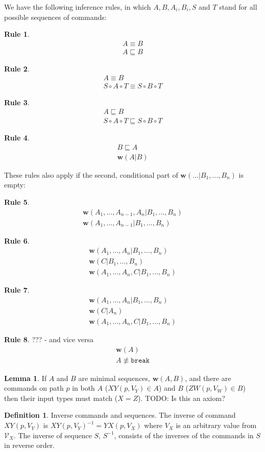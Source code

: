 \documentclass[12pt]{article}
\newcommand{\setvx}[1]{\mathcal{V}_{#1}}
\newcommand{\cbrk}{\mathtt{break}}
\newcommand{\fscommand}[2]{{#1#2}}
\newcommand{\cxy}{\fscommand{X}{Y}}
\newcommand{\cyx}{\fscommand{Y}{X}}
\newcommand{\czw}{\fscommand{Z}{W}}
\newcommand{\cc}{\circ}
\newcommand{\eqext}{\sqsubseteq}
\newcommand{\nequiv}{\not\equiv}
\newcommand{\works}[1]{{\mathbf{w}}({#1})}
\newcommand{\worksc}[2]{{\mathbf{w}}({#1}|{#2})}
\newcommand{\infer}[2]{\begin{array}{c}{#1}\\\hline{#2}\end{array}}
\newcommand{\inferr}[3]{\begin{array}{c}{#1}\\{#2}\\\hline{#3}\end{array}}
\theoremstyle{definition}
\newtheorem{mydef}{Definition}
\newtheorem{mylem}{Lemma}
\newtheorem{myrul}{Rule}
\begin{document}
We have the following inference rules, in which $A,B,A_i,B_i,S$ and $T$ stand for all possible sequences of commands:

\begin{myrul}\label{r_eq_ex}
\[\infer{A\equiv B}{A\eqext B}\]
\end{myrul}

\begin{myrul}
\[\infer{A\equiv B}{S\cc A\cc T\equiv S\cc B\cc T}\]
\end{myrul}

\begin{myrul}
\[\infer{A\eqext B}{S\cc A\cc T\eqext S\cc B\cc T}\]
\end{myrul}

\begin{myrul}\label{r_ex_w}
\[\infer{B\eqext A}{\worksc{A}{B}}\]
\end{myrul}

These rules also apply if the second, conditional part of $\worksc{\ldots}{B_1,\ldots,B_n}$ is empty:

\begin{myrul}
\[\infer{\worksc{A_1,\ldots,A_{n-1},A_n}{B_1,\ldots,B_n}}{\worksc{A_1,\ldots,A_{n-1}}{B_1,\ldots,B_n}}\]
\end{myrul}

\begin{myrul}\label{r_w_combine}
\[\inferr{\worksc{A_1,\ldots,A_n}{B_1,\ldots,B_n}}{\worksc{C}{B_1,\ldots,B_n}}{\worksc{A_1,\ldots,A_n,C}{B_1,\ldots,B_n}}\]
\end{myrul}

\begin{myrul}\label{r_w_w}
\[\inferr{\worksc{A_1,\ldots,A_n}{B_1,\ldots,B_n}}{\worksc{C}{A_n}}{\worksc{A_1,\ldots,A_n,C}{B_1,\ldots,B_n}}\]
\end{myrul}

\begin{myrul}{??? - and vice versa}
\[\infer{\works{A}}{A\nequiv\cbrk}\]
\end{myrul}

\begin{mylem}\label{worksinputmatch}
If $A$ and $B$ are minimal sequences, $\works{A,B}$,
and there are commands on path $p$ in both $A$ ($\cxy(p, V_Y)\in A$) and $B$ ($\czw(p, V_W)\in B$)
then their input types must match ($X=Z$).
TODO: Is this an axiom?
\end{mylem}

\begin{mydef}{Inverse commands and sequences.}
The inverse of command $\cxy(p,V_Y)$ is $\cxy(p,V_Y)^{-1} = \cyx(p,V_X)$
where $V_X$ is an arbitrary value from $\setvx{X}$.
The inverse of sequence $S$, $S^{-1}$, consists of the inverses of the commands in $S$
in reverse order.
\end{mydef}
\end{document}
